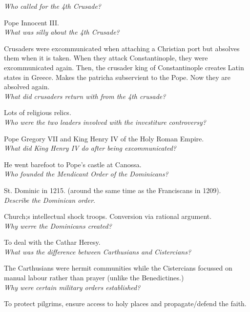 \documentclass[12pt]{article}
\begin{document}
\textit{Who called for the 4th Crusade?}

Pope Innocent III.\\

\textit{What was silly about the 4th Crusade?}

Crusaders were excommunicated when attaching a Christian port but absolves them when it is taken. When they attack Constantinople, they were excommunicated again.
Then, the crusader king of Constantinople creates Latin states in Greece. Makes the patricha subservient to the Pope. Now they are absolved again.\\

\textit{What did crusaders return with from the 4th crusade?}

Lots of religious relics.\\

\textit{Who were the two leaders involved with the investiture controversy?}

Pope Gregory VII and King Henry IV of the Holy Roman Empire.\\

\textit{What did King Henry IV do after being excommunicated?}

He went barefoot to Pope's castle at Canossa.\\

\textit{Who founded the Mendicant Order of the Dominicans?}

St. Dominic in 1215. (around the same time as the Franciscans in 1209).\\

\textit{Describe the Dominican order}.

Church;s intellectual shock troops. Conversion via rational argument.\\

\textit{Why werre the Dominicans created?}

To deal with the Cathar Heresy.\\

\textit{What was the difference between Carthusians and Cistercians?}

The Carthusians were hermit communities while the Cistercians focussed on manual labour rather than prayer (unlike the Benedictines.)\\

\textit{Why were certain military orders established?}

To protect pilgrims, ensure access to holy places and propagate/defend the faith.\\
\end{document}
